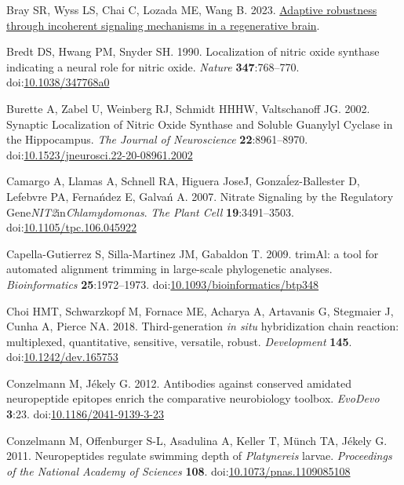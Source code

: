 \documentclass[
  10pt,
  onecolumn]{article}
\newlength{\cslhangindent}
\newlength{\cslentryspacingunit} %
\newenvironment{CSLReferences}[2] %
 {%
  \setlength{\parindent}{0pt}
  \ifodd #1
  \let\oldpar\par
  \def\par{\hangindent=\cslhangindent\oldpar}
  \fi
  \setlength{\parskip}{#2\cslentryspacingunit}
 }%
 {}
\begin{document}
\begin{CSLReferences}{1}{0}
\leavevmode{}%
Bray SR, Wyss LS, Chai C, Lozada ME, Wang B. 2023.
\href{http://dx.doi.org/10.1101/2023.01.20.523817}{Adaptive robustness
through incoherent signaling mechanisms in a regenerative brain}.

\leavevmode{}%
Bredt DS, Hwang PM, Snyder SH. 1990. Localization of nitric oxide
synthase indicating a neural role for nitric oxide. \emph{Nature}
\textbf{347}:768--770.
doi:\href{https://doi.org/10.1038/347768a0}{10.1038/347768a0}

\leavevmode{}%
Burette A, Zabel U, Weinberg RJ, Schmidt HHHW, Valtschanoff JG. 2002.
Synaptic Localization of Nitric Oxide Synthase and Soluble Guanylyl
Cyclase in the Hippocampus. \emph{The Journal of Neuroscience}
\textbf{22}:8961--8970.
doi:\href{https://doi.org/10.1523/jneurosci.22-20-08961.2002}{10.1523/jneurosci.22-20-08961.2002}

\leavevmode{}%
Camargo A, Llamas A, Schnell RA, Higuera JoseJ́, Gonzaĺez-Ballester D,
Lefebvre PA, Fernańdez E, Galvań A. 2007. Nitrate Signaling by the
Regulatory Gene{\emph{NIT2}}in{\emph{Chlamydomonas}}. \emph{The Plant
Cell} \textbf{19}:3491--3503.
doi:\href{https://doi.org/10.1105/tpc.106.045922}{10.1105/tpc.106.045922}

\leavevmode{}%
Capella-Gutierrez S, Silla-Martinez JM, Gabaldon T. 2009. trimAl: a tool
for automated alignment trimming in large-scale phylogenetic analyses.
\emph{Bioinformatics} \textbf{25}:1972--1973.
doi:\href{https://doi.org/10.1093/bioinformatics/btp348}{10.1093/bioinformatics/btp348}

\leavevmode{}%
Choi HMT, Schwarzkopf M, Fornace ME, Acharya A, Artavanis G, Stegmaier
J, Cunha A, Pierce NA. 2018. Third-generation {\emph{in situ}}
hybridization chain reaction: multiplexed, quantitative, sensitive,
versatile, robust. \emph{Development} \textbf{145}.
doi:\href{https://doi.org/10.1242/dev.165753}{10.1242/dev.165753}

\leavevmode{}%
Conzelmann M, Jékely G. 2012. Antibodies against conserved amidated
neuropeptide epitopes enrich the comparative neurobiology toolbox.
\emph{EvoDevo} \textbf{3}:23.
doi:\href{https://doi.org/10.1186/2041-9139-3-23}{10.1186/2041-9139-3-23}

\leavevmode{}%
Conzelmann M, Offenburger S-L, Asadulina A, Keller T, Münch TA, Jékely
G. 2011. Neuropeptides regulate swimming depth of {\emph{Platynereis}}
larvae. \emph{Proceedings of the National Academy of Sciences}
\textbf{108}.
doi:\href{https://doi.org/10.1073/pnas.1109085108}{10.1073/pnas.1109085108}


\end{CSLReferences}
\end{document}
